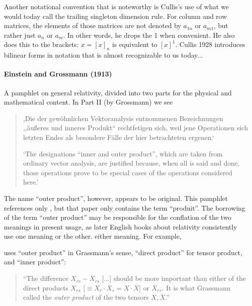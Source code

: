 Another notational convention that is noteworthy is Cullis's use of what we
would today call the trailing singleton dimension rule. For column and row
matrices, the elements of those matrices are not denoted by $a_{1n}$ or
$a_{m1}$, but rather just $a_n$ or $a_m$. In other words, he drops the 1 when
convenient. He also does this to the brackets: $x = {[x]}_n$ is equivalent to
${[x]}^1$.
Cullis 1928 introduces bilinear forms in notation that is almost recognizable to us today...



\paragraph{Einstein and Grossmann (1913)}

A pamphlet on general relativity, divided into two parts for the physical and mathematical content. In Part II (by Grossmann) we see

\begin{quote}

,Die der gewöhnlichen Vektoranalysis entnommenen Bezeichnungen ,,äußeres und inneres Produkt`` rechtfetigen sich, weil jene Operationen sich letzten Endes als besondere Fälle der hier betrachteten ergenen.`~\cite[p. 26]{Einstein1913}\cite[p. 327]{Einstein1995}

`The designations ``inner and outer product'', which are taken from ordinary vector analysis, are justified because, when all is said and done, those operations prove to be special cases of the operations considered here.'~\cite[p. 175]{Einstein1996}
\end{quote}
The name ``outer product'', however, appears to be original. This pamphlet references only \cite{Ricci1900}, but that paper only contains the term ``produit''.
The borrowing of the term ``outer product'' may be responsible for the conflation of the two meanings in present usage, as later English books about relativity consistently use one meaning or the other. either meaning. For example,

\cite[p. 25]{Murnaghan1922} uses ``outer product'' in Grassmann's sense, ``direct product'' for tensor product, and ``inner product'':
\begin{quote}
``The difference $X_{rs} - \overline X_{rs}$ [...] should be more important than either of the direct products $X_{rs}$ [$\equiv X_r \cdot \overline X_s = X \cdot \overline X$] or $\overline X_{rs}$. It is what Grassmann called the \textit{outer product} of the two tensors $X, \overline X$.''
\end{quote}

